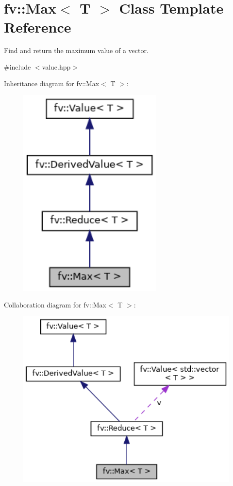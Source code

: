 \hypertarget{classfv_1_1Max}{}\section{fv\+:\+:Max$<$ T $>$ Class Template Reference}
\label{classfv_1_1Max}


Find and return the maximum value of a vector.  




{\ttfamily \#include $<$value.\+hpp$>$}



Inheritance diagram for fv\+:\+:Max$<$ T $>$\+:
\nopagebreak
\begin{figure}[H]
\begin{center}
\leavevmode
\includegraphics[width=205pt]{classfv_1_1Max__inherit__graph}
\end{center}
\end{figure}


Collaboration diagram for fv\+:\+:Max$<$ T $>$\+:
\nopagebreak
\begin{figure}[H]
\begin{center}
\leavevmode
\includegraphics[width=350pt]{classfv_1_1Max__coll__graph}
\end{center}
\end{figure}
